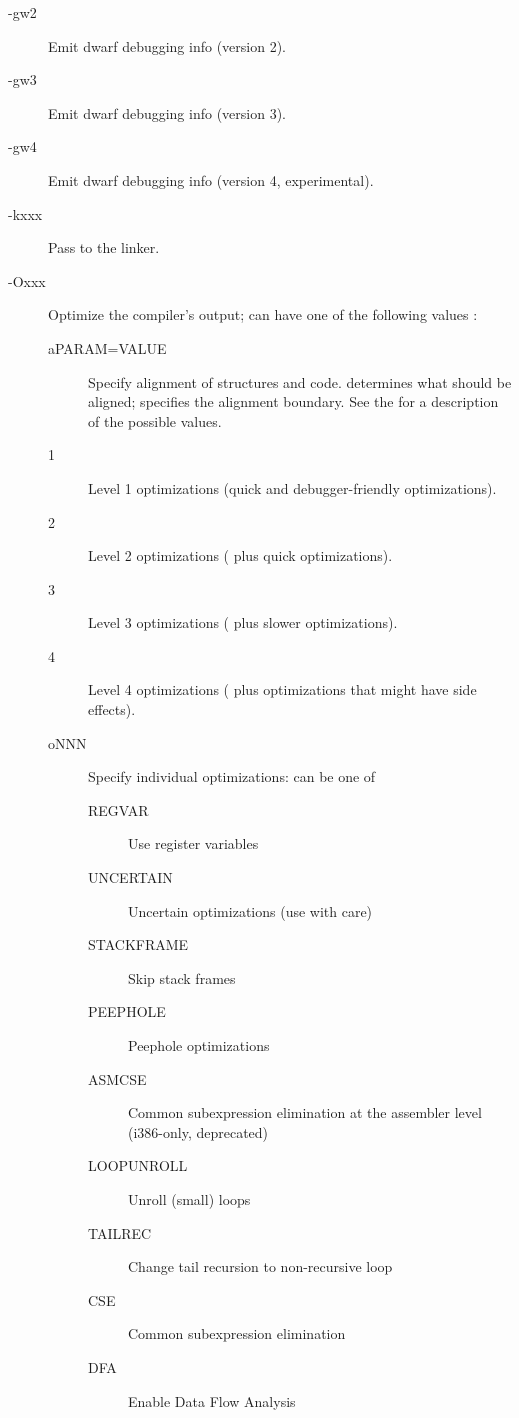 \begin{description}
\item [-gw2] Emit dwarf debugging info (version 2).
\item [-gw3] Emit dwarf debugging info (version 3).
\item [-gw4] Emit dwarf debugging info (version 4, experimental).
\item[-kxxx] Pass  to the linker.
\item[-Oxxx]  Optimize the compiler's output;  can have one
of the following values :
\begin{description}
\item[aPARAM=VALUE] Specify alignment of structures and code. 
determines what should be aligned;  specifies the alignment
boundary. See the \progref for a description of the possible
values.
\item[1] Level 1 optimizations (quick and debugger-friendly optimizations).
\item[2] Level 2 optimizations ( plus quick optimizations).
\item[3] Level 3 optimizations ( plus slower optimizations).
\item[4] Level 4 optimizations ( plus optimizations that might have side effects).
\item[oNNN] Specify individual optimizations:  can be one of
\begin{description}
\item[REGVAR] Use register variables
\item[UNCERTAIN] Uncertain optimizations (use with care)
\item[STACKFRAME] Skip stack frames
\item[PEEPHOLE] Peephole optimizations
\item[ASMCSE] Common subexpression elimination at the assembler level (i386-only, deprecated)
\item[LOOPUNROLL] Unroll (small) loops
\item[TAILREC] Change tail recursion to non-recursive loop
\item[CSE] Common subexpression elimination
\item[DFA] Enable Data Flow Analysis

\end{description}
\end{description}
\end{description}
